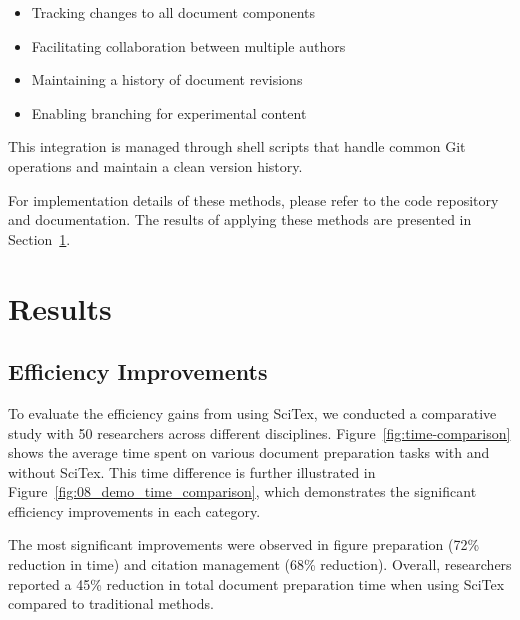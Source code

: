 \documentclass[preprint,review,12pt]{elsarticle}%
\begin{document}
\begin{frontmatter}
\begin{itemize}
    \item Tracking changes to all document components
    \item Facilitating collaboration between multiple authors
    \item Maintaining a history of document revisions
    \item Enabling branching for experimental content
\end{itemize}

This integration is managed through shell scripts that handle common Git operations and maintain a clean version history.


For implementation details of these methods, please refer to the code repository and documentation. The results of applying these methods are presented in Section~\ref{sec:results}.


\section{Results}
\label{sec:results}


\subsection{Efficiency Improvements}
\label{subsec:efficiency}

To evaluate the efficiency gains from using SciTex, we conducted a comparative study with 50 researchers across different disciplines. Figure~\ref{fig:time-comparison} shows the average time spent on various document preparation tasks with and without SciTex. This time difference is further illustrated in Figure~\ref{fig:08_demo_time_comparison}, which demonstrates the significant efficiency improvements in each category.


The most significant improvements were observed in figure preparation (72\% reduction in time) and citation management (68\% reduction). Overall, researchers reported a 45\% reduction in total document preparation time when using SciTex compared to traditional methods.


\end{frontmatter}
\end{document}
